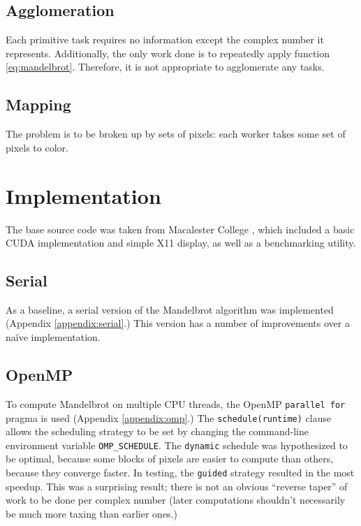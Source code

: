 \documentclass{article}
\begin{document}
    \subsection{Agglomeration}
        Each primitive task requires no information except the complex number it represents. Additionally, the only work done is to repeatedly apply function \ref{eq:mandelbrot}. Therefore, it is not appropriate to agglomerate any tasks.

    \subsection{Mapping}
        The problem is to be broken up by sets of pixels: each worker takes some set of pixels to color.


\section{Implementation} \label{sec:impl}
    The base source code was taken from Macalester College \cite{mandel_orig}, which included a basic CUDA implementation and simple X11 display, as well as a benchmarking utility.

    \subsection{Serial}
        As a baseline, a serial version of the Mandelbrot algorithm was implemented (Appendix \ref{appendix:serial}.) This version has a number of improvements over a na\"ive implementation.

    \subsection{OpenMP}
        To compute Mandelbrot on multiple CPU threads, the OpenMP \verb|parallel for| pragma is used (Appendix \ref{appendix:omp}.) The \verb|schedule(runtime)| clause allows the scheduling strategy to be set by changing the command-line environment variable \verb|OMP_SCHEDULE|. The \verb|dynamic| schedule was hypothesized to be optimal, because some blocks of pixels are easier to compute than others, because they converge faster. In testing, the \verb|guided| strategy resulted in the most speedup. This was a surprising result; there is not an obvious ``reverse taper'' of work to be done per complex number (later computations shouldn't necessarily be much more taxing than earlier ones.)
\end{document}
